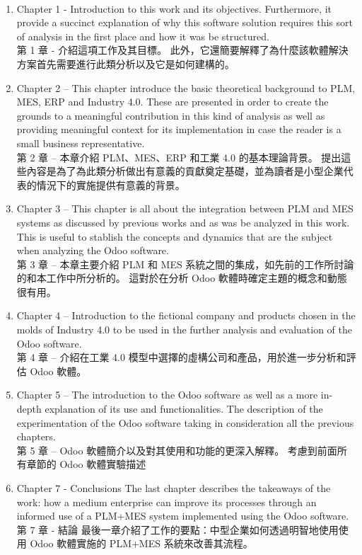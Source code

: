 \fontsize{12}{2.5pt}\selectfont {這項工作可以為小型製造企業中所描述的解決方案的實際實施提供參考，並且可以將其視為 PLM-MES 及其實施的介紹材料，以及 Odoo 軟體的首要原則和當前狀態的回顧它。 為此，本文提出以下結構：}\\[15pt]
\begin{enumerate}[{\hspace{0.5em}\textbullet}]
\fontsize{12}{2.5pt}\selectfont
            \item Chapter 1 - Introduction to this work and its objectives. Furthermore, it provide a 
succinct explanation of why this software solution requires this sort of analysis in the 
first place and how it was be structured.\\
第 1 章 - 介紹這項工作及其目標。 此外，它還簡要解釋了為什麼該軟體解決方案首先需要進行此類分析以及它是如何建構的。
\item Chapter 2 – This chapter introduce the basic theoretical background to PLM, MES, 
ERP and Industry 4.0. These are presented in order to create the grounds to a 
meaningful contribution in this kind of analysis as well as providing meaningful 
context for its implementation in case the reader is a small business representative.\\
第 2 章 – 本章介紹 PLM、MES、ERP 和工業 4.0 的基本理論背景。 提出這些內容是為了為此類分析做出有意義的貢獻奠定基礎，並為讀者是小型企業代表的情況下的實施提供有意義的背景。
\item Chapter 3 – This chapter is all about the integration between PLM and MES systems 
as discussed by previous works and as was be analyzed in this work. This is useful to 
stablish the concepts and dynamics that are the subject when analyzing the Odoo
software.\\
第 3 章 – 本章主要介紹 PLM 和 MES 系統之間的集成，如先前的工作所討論的和本工作中所分析的。 這對於在分析 Odoo 軟體時確定主題的概念和動態很有用。
\item Chapter 4 – Introduction to the fictional company and products chosen in the molds 
of Industry 4.0 to be used in the further analysis and evaluation of the Odoo software.\\
第 4 章 – 介紹在工業 4.0 模型中選擇的虛構公司和產品，用於進一步分析和評估 Odoo 軟體。
\item  Chapter 5 – The introduction to the Odoo software as well as a more in-depth
explanation of its use and functionalities. The description of the experimentation of 
the Odoo software taking in consideration all the previous chapters.\\
第 5 章 – Odoo 軟體簡介以及對其使用和功能的更深入解釋。 考慮到前面所有章節的 Odoo 軟體實驗描述
\item Chapter 7 - Conclusions The last chapter describes the takeaways of the work: how a 
medium enterprise can improve its processes through an informed use of a 
PLM+MES system implemented using the Odoo software.\\
第 7 章 - 結論 最後一章介紹了工作的要點：中型企業如何透過明智地使用使用 Odoo 軟體實施的 PLM+MES 系統來改善其流程。

\end{enumerate}
\renewcommand{\baselinestretch}{0.5} %
